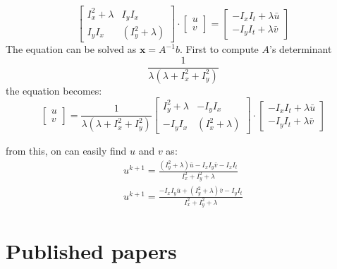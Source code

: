 \begin{equation}
	\begin{bmatrix}
	I_x^2+\lambda & I_y I_x \\
	I_y I_x & (I_y^2+\lambda)
	\end{bmatrix}
	\cdot
	\begin{bmatrix}
	u \\
	v
	\end{bmatrix}
	=
		\begin{bmatrix}
	-I_xI_t + \lambda \bar{u}\\
	-I_yI_t + \lambda \bar{v}
		\end{bmatrix}
\end{equation}
The equation can be solved as $\boldsymbol{x} = A^{-1}b $. First to compute 
$A$'s determinant
\begin{equation}
	\frac{1}{\lambda(\lambda+I_x^2 + I_y^2)}
\end{equation}
the equation becomes:
\begin{equation}
\begin{bmatrix}
u \\
v
\end{bmatrix}
=
\frac{1}{\lambda(\lambda+I_x^2 + I_y^2)}
\begin{bmatrix}
I_y^2+\lambda & -I_y I_x \\
-I_y I_x & (I_x^2+\lambda)
\end{bmatrix}
\cdot
\begin{bmatrix}
-I_xI_t + \lambda \bar{u}\\
-I_yI_t + \lambda \bar{v}
\end{bmatrix}
\end{equation}

from this, on can easily find $u$ and $v$ as:
\begin{equation} \label{JEq}
\begin{split}
u^{k+1} = \frac{(I_{y}^2+\lambda)\bar{u}
	-I_{x}I_{y}\bar{v}
	-I_{x}I_{t}}{I_{x}^2+I_{y}^2+ \lambda}
\\
u^{k+1} = \frac{-I_{x}I_{y}\bar{u}
	+(I_{y}^2+\lambda)\bar{v}
	-I_{y}I_{t}}{I_{x}^2+I_{y}^2+ \lambda}
\end{split}
\end{equation}


\chapter{Published papers}